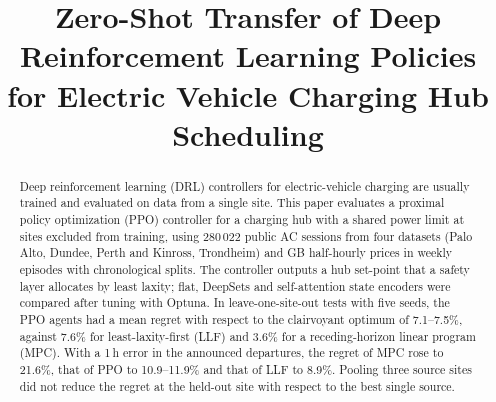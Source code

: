 \documentclass[conference]{IEEEtran}
\begin{document}

\title{Zero-Shot Transfer of Deep Reinforcement Learning Policies for Electric Vehicle Charging Hub Scheduling}

\author{
}

\maketitle

\begin{abstract}
Deep reinforcement learning (DRL) controllers for electric-vehicle charging are usually trained and
evaluated on data from a single site. This paper evaluates a proximal policy optimization (PPO)
controller for a charging hub with a shared power limit at sites excluded from training, using
280\,022 public AC sessions from four datasets (Palo Alto, Dundee, Perth and Kinross, Trondheim) and
GB half-hourly prices in weekly episodes with chronological splits. The controller outputs a hub
set-point that a safety layer allocates by least laxity; flat, DeepSets and self-attention state
encoders were compared after tuning with Optuna. In leave-one-site-out tests with five seeds, the PPO agents had a mean regret with respect to
the clairvoyant optimum of 7.1--7.5\%, against 7.6\% for least-laxity-first (LLF) and 3.6\% for a
receding-horizon linear program (MPC). With a 1\,h error in the announced departures, the regret of MPC
rose to 21.6\%, that of PPO to 10.9--11.9\% and that of LLF to 8.9\%. Pooling three source sites did
not reduce the regret at the held-out site with respect to the best single source.
\end{abstract}
\end{document}
